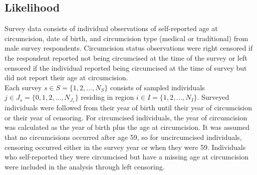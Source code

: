 \documentclass{article}
\begin{document}
\begin{appendix}

\subsection{Likelihood}


Survey data consists of individual observations of self-reported age at circumcision, date of birth, and circumcision type (medical or traditional) from male survey respondents. Circumcision status observations were right censored if the respondent reported not being circumcised at the time of the survey or left censored if the individual reported being circumcised at the time of survey but did not report their age at circumcision.\\

\noindent Each survey $s \in S = \{1, 2, \ldots, N_S\}$ consists of sampled individuals $j \in J_s = \{0, 1, 2, \ldots, N_{J_s}\}$ residing in region $i \in I = \{1, 2, \ldots, N_I\}$. Surveyed individuals were followed from their year of birth until their year of circumcision or their year of censoring. For circumcised individuals, the year of circumcision was calculated as the year of birth plus the age at circumcision. It was assumed that no circumcisions occurred after age 59, so for uncircumcised individuals, censoring occurred either in the survey year or when they were 59. Individuals who self-reported they were circumcised but have a missing age at circumcision were included in the analysis through left censoring. \\


\end{appendix}
\end{document}
